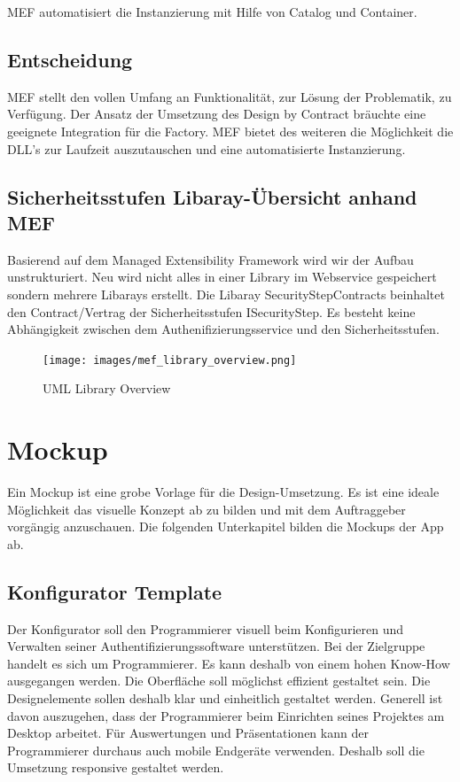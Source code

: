 MEF automatisiert die Instanzierung mit Hilfe von Catalog und Container.

\subsection{Entscheidung}\label{entscheidung-1}

MEF stellt den vollen Umfang an Funktionalität, zur Lösung der
Problematik, zu Verfügung. Der Ansatz der Umsetzung des Design by
Contract bräuchte eine geeignete Integration für die Factory. MEF bietet
des weiteren die Möglichkeit die DLL's zur Laufzeit auszutauschen und
eine automatisierte Instanzierung.

\newpage

\subsection{Sicherheitsstufen Libaray-Übersicht anhand
MEF}\label{sicherheitsstufen-libaray-uxfcbersicht-anhand-mef}

Basierend auf dem Managed Extensibility Framework wird wir der Aufbau
unstrukturiert. Neu wird nicht alles in einer Library im Webservice
gespeichert sondern mehrere Libarays erstellt. Die Libaray
SecurityStepContracts beinhaltet den Contract/Vertrag der
Sicherheitsstufen ISecurityStep. Es besteht keine Abhängigkeit zwischen
dem Authenifizierungsservice und den Sicherheitsstufen.

\begin{figure}[htbp]
\centering
\texttt{[image: images/mef\_library\_overview.png]}
\caption{UML Library Overview}
\end{figure}

\newpage

\section{Mockup}\label{mockup}

Ein Mockup ist eine grobe Vorlage für die Design-Umsetzung. Es ist eine
ideale Möglichkeit das visuelle Konzept ab zu bilden und mit dem
Auftraggeber vorgängig anzuschauen. Die folgenden Unterkapitel bilden
die Mockups der App ab.

\subsection{Konfigurator Template}\label{konfigurator-template}

Der Konfigurator soll den Programmierer visuell beim Konfigurieren und
Verwalten seiner Authentifizierungssoftware unterstützen. Bei der
Zielgruppe handelt es sich um Programmierer. Es kann deshalb von einem
hohen Know-How ausgegangen werden. Die Oberfläche soll möglichst
effizient gestaltet sein. Die Designelemente sollen deshalb klar und
einheitlich gestaltet werden. Generell ist davon auszugehen, dass der
Programmierer beim Einrichten seines Projektes am Desktop arbeitet. Für
Auswertungen und Präsentationen kann der Programmierer durchaus auch
mobile Endgeräte verwenden. Deshalb soll die Umsetzung responsive
gestaltet werden.

